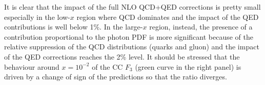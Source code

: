 It is clear that the impact of the full NLO QCD+QED corrections is
pretty small especially in the low-$x$ region where QCD dominates and
the impact of the QED contributions is well below 1\%. In the
large-$x$ region, instead, the presence of a contribution proportional
to the photon PDF is more significant because of the relative
suppression of the QCD distributions (quarks and gluon) and the impact
of the QED corrections reaches the 2\% level.  It should be stressed
that the behaviour around $x=10^{-2}$ of the CC $F_3$ (green curve in
the right panel) is driven by a change of sign of the predictions so
that the ratio diverges.

